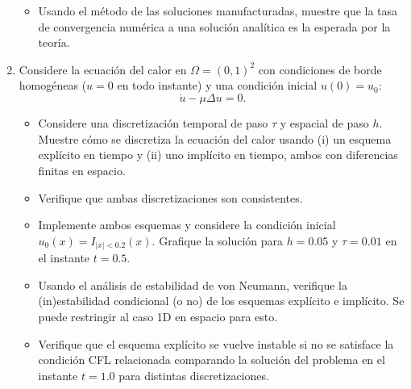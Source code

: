 \documentclass{article}
\newcommand{\pts}[1]{[{\bf #1 puntos}]}
\begin{document}
\begin{enumerate}
\begin{itemize}
                \item\pts{2} Usando el método de las soluciones manufacturadas, muestre que la tasa de convergencia numérica a una solución analítica es la esperada por la teoría. 
            \end{itemize}
    \item Considere la ecuación del calor en $\Omega = (0,1)^2$ con condiciones de borde homogéneas ($u=0$ en todo instante) y una condición inicial $u(0)=u_0$:
            $$ \dot u - \mu \Delta u = 0 . $$
            \begin{itemize}
                \item\pts{1} Considere una discretización temporal de paso $\tau$ y espacial de paso $h$. Muestre cómo se discretiza la ecuación del calor usando (i) un esquema explícito en tiempo y (ii) uno implícito en tiempo, ambos con diferencias finitas en espacio.
                \item\pts{2} Verifique que ambas discretizaciones son consistentes. 
                \item\pts{3} Implemente ambos esquemas y considere la condición inicial $u_0(x) = I_{|x| < 0.2}(x)$. Grafique la solución para $h=0.05$ y $\tau=0.01$ en el instante $t=0.5$. 
                \item\pts{2} Usando el análisis de estabilidad de von Neumann, verifique la (in)estabilidad condicional (o no) de los esquemas explícito e implícito. Se puede restringir al caso 1D en espacio para esto. 
                \item\pts{2} Verifique que el esquema explícito se vuelve instable si no se satisface la condición CFL relacionada comparando la solución del problema en el instante $t=1.0$ para distintas discretizaciones.
            \end{itemize}
\end{enumerate}

\end{document}
